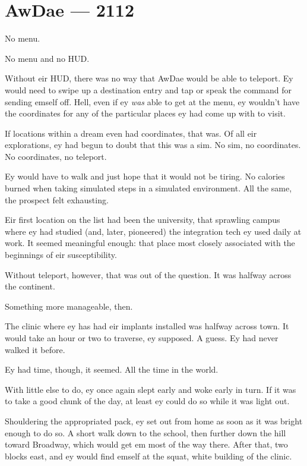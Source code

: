 \hypertarget{rj-brewster-2112}{%
\chapter*{AwDae — 2112}\label{rj-brewster-2112}}

No menu.

No menu and no HUD.

Without eir HUD, there was no way that AwDae would be able to teleport. Ey would need to swipe up a destination entry and tap or speak the command for sending emself off. Hell, even if ey \emph{was} able to get at the menu, ey wouldn't have the coordinates for any of the particular places ey had come up with to visit.

If locations within a dream even had coordinates, that was. Of all eir explorations, ey had begun to doubt that this was a sim. No sim, no coordinates. No coordinates, no teleport.

Ey would have to walk and just hope that it would not be tiring. No calories burned when taking simulated steps in a simulated environment. All the same, the prospect felt exhausting.

Eir first location on the list had been the university, that sprawling campus where ey had studied (and, later, pioneered) the integration tech ey used daily at work. It seemed meaningful enough: that place most closely associated with the beginnings of eir susceptibility.

Without teleport, however, that was out of the question. It was halfway across the continent.

Something more manageable, then.

The clinic where ey has had eir implants installed was halfway across town. It would take an hour or two to traverse, ey supposed. A guess. Ey had never walked it before.

Ey had time, though, it seemed. All the time in the world.

With little else to do, ey once again slept early and woke early in turn. If it was to take a good chunk of the day, at least ey could do so while it was light out.

Shouldering the appropriated pack, ey set out from home as soon as it was bright enough to do so. A short walk down to the school, then further down the hill toward Broadway, which would get em most of the way there. After that, two blocks east, and ey would find emself at the squat, white building of the clinic.

